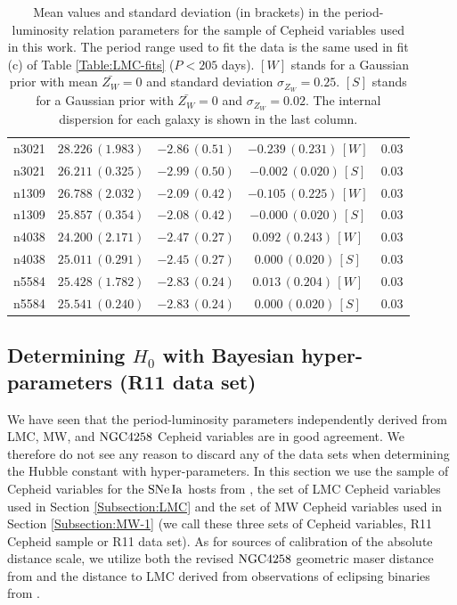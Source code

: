 \begin{table}[tbp]
\begin{tabular}{@{}ccccc}
 n3021 & $28.226\,(1.983)$ & $-2.86\,(0.51)$ & $-0.239\,(0.231)\,[W]$ & $0.03$ \\

 n3021 & $26.211\,(0.325)$ & $-2.99\,(0.50)$ & $-0.002\,(0.020)\,[S]$ & $0.03$ \\
  
 n1309 & $26.788\,(2.032)$ & $-2.09\,(0.42)$ & $-0.105\,(0.225)\,[W]$ & $0.03$ \\

 n1309 & $25.857\,(0.354)$ & $-2.08\,(0.42)$ & $-0.000\,(0.020)\,[S]$ & $0.03$ \\
   
 n4038 & $24.200\,(2.171)$ & $-2.47\,(0.27)$ & $0.092\,(0.243)\,[W]$ & $0.03$ \\

 n4038 & $25.011\,(0.291)$ & $-2.45\,(0.27)$ & $0.000\,(0.020)\,[S]$ & $0.03$ \\
    
 n5584 & $25.428\,(1.782)$ & $-2.83\,(0.24)$ & $0.013\,(0.204)\,[W]$ & $0.03$ \\   

 n5584 & $25.541\,(0.240)$ & $-2.83\,(0.24)$ & $0.000\,(0.020)\,[S]$ & $0.03$ \\   
 
\hline
\end{tabular}
\caption{\label{Table:Zw-dependence-of-PL-relation} Mean values and standard deviation (in brackets) in the period-luminosity relation parameters for the sample of Cepheid variables used in this work. The period range used to fit the data is the same used in fit (c) of Table \ref{Table:LMC-fits} ($P<205$ days). $[W]$ stands for a Gaussian prior with mean  $\bar{Z_W}=0$ and standard deviation $\sigma_{Z_W}=0.25$. $[S]$ stands for a Gaussian prior with $\bar{Z_W}=0$ and $\sigma_{Z_W}=0.02$. The internal dispersion for each galaxy is shown in the last column.}
\end{table}

\subsection{Determining $H_0$ with Bayesian hyper-parameters (R11 data set)}
\label{Subsection:combining-anchors}

We have seen that the period-luminosity parameters independently derived from LMC, MW, and $\mathrm{NGC4258}$ Cepheid variables are in good agreement. We therefore do not see any reason to discard any of the data sets when determining the Hubble constant with hyper-parameters. In this section we use the sample of Cepheid variables for the $\mathrm{SNe\,Ia}$ hosts from \cite{Riess:2011yx}, the set of LMC Cepheid variables used in Section \ref{Subsection:LMC} and the set of MW Cepheid variables used in Section \ref{Subsection:MW-1} (we call these three sets of Cepheid variables, R11 Cepheid sample or R11 data set). As for sources of calibration of the absolute distance scale, we utilize both the revised $\mathrm{NGC4258}$ geometric maser distance from \cite{Humphreys:2013eja} and the distance to LMC derived from observations of eclipsing binaries from \cite{Pietrzynski:2013gia}.

